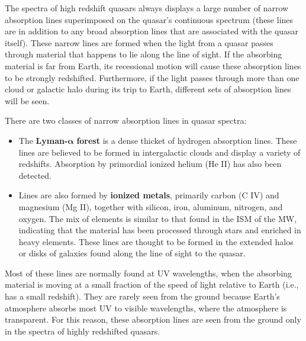 \documentclass[a4paper,10pt]{article}
\begin{document}
{\noindent}The spectra of high redshift quasars always displays a large number of narrow absorption lines superimposed on the quasar's continuous spectrum (these lines are in addition to any broad absorption lines that are associated with the quasar itself). These narrow lines are formed when the light from a quasar passes through material that happens to lie along the line of sight. If the absorbing material is far from Earth, its recessional motion will cause these absorption lines to be strongly redshifted. Furthermore, if the light passes through more than one cloud or galactic halo during its trip to Earth, different sets of absorption lines will be seen.

{\noindent}There are two classes of narrow absorption lines in quasar spectra:

\begin{itemize}
    \item The \textbf{Lyman-}$\boldsymbol{\alpha}$ \textbf{forest} is a dense thicket of hydrogen absorption lines. These lines are believed to be formed in intergalactic clouds and display a variety of redshifts. Absorption by primordial ionized helium (He II) has also been detected.
    \item Lines are also formed by \textbf{ionized metals}, primarily carbon (C IV) and magnesium (Mg II), together with silicon, iron, aluminum, nitrogen, and oxygen. The mix of elements is similar to that found in the ISM of the MW, indicating that the material has been processed through stars and enriched in heavy elements. These lines are thought to be formed in the extended halos or disks of galaxies found along the line of sight to the quasar.
\end{itemize}

{\noindent}Most of these lines are normally found at UV wavelengths, when the absorbing material is moving at a small fraction of the speed of light relative to Earth (i.e., has a small redshift). They are rarely seen from the ground because Earth's atmosphere absorbs most UV to visible wavelengths, where the atmosphere is transparent. For this reason, these absorption lines are seen from the ground only in the spectra of highly redshifted quasars.
\end{document}
